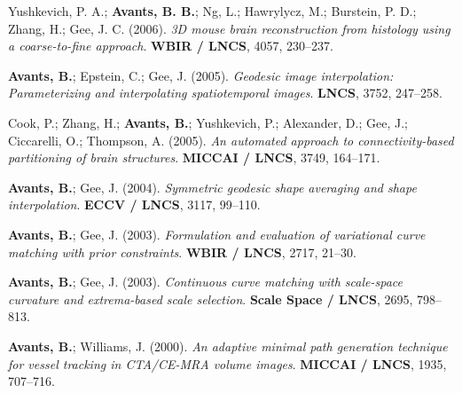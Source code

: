 \documentclass[10pt,letterpaper]{article}
\begin{document}
\begin{enumerate}
{  \item Yushkevich, P. A.; \textbf{Avants, B. B.}; Ng, L.; Hawrylycz, M.; Burstein, P. D.; Zhang, H.; Gee, J. C. (2006). \textit{3D mouse brain reconstruction from histology using a coarse-to-fine approach}. \textbf{WBIR / LNCS}, 4057, 230--237.
  \item \textbf{Avants, B.}; Epstein, C.; Gee, J. (2005). \textit{Geodesic image interpolation: Parameterizing and interpolating spatiotemporal images}. \textbf{LNCS}, 3752, 247--258.
  \item Cook, P.; Zhang, H.; \textbf{Avants, B.}; Yushkevich, P.; Alexander, D.; Gee, J.; Ciccarelli, O.; Thompson, A. (2005). \textit{An automated approach to connectivity-based partitioning of brain structures}. \textbf{MICCAI / LNCS}, 3749, 164--171.
  \item \textbf{Avants, B.}; Gee, J. (2004). \textit{Symmetric geodesic shape averaging and shape interpolation}. \textbf{ECCV / LNCS}, 3117, 99--110.
  \item \textbf{Avants, B.}; Gee, J. (2003). \textit{Formulation and evaluation of variational curve matching with prior constraints}. \textbf{WBIR / LNCS}, 2717, 21--30.
  \item \textbf{Avants, B.}; Gee, J. (2003). \textit{Continuous curve matching with scale-space curvature and extrema-based scale selection}. \textbf{Scale Space / LNCS}, 2695, 798--813.
  \item \textbf{Avants, B.}; Williams, J. (2000). \textit{An adaptive minimal path generation technique for vessel tracking in CTA/CE-MRA volume images}. \textbf{MICCAI / LNCS}, 1935, 707--716.
}
\end{enumerate}
\end{document}
